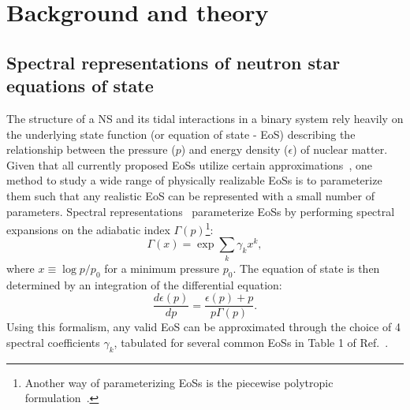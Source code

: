 \documentclass[prd,twocolumn,nofootinbib,superscriptaddress,amsmath,amssymb]{revtex4-1}
\begin{document}
\section{Background and theory}\label{sec:theory}

\subsection{Spectral representations of neutron star equations of state}
\label{sec:eos}

The structure of a NS and its tidal interactions in a binary system rely heavily on the underlying state function (or equation of state - EoS) describing the relationship between the pressure ($p$) and energy density ($\epsilon$) of nuclear matter.
Given that all currently proposed EoSs utilize certain approximations~\cite{Oertel:Review,Baym:Review}, one method to study a wide range of physically realizable EoSs is to parameterize them such that any realistic EoS can be represented with a small number of parameters.
Spectral representations~\cite{Lindblom:2010bb,Lindblom:2012zi,Lindblom:2013kra,Lindblom:2018rfr,Abbott:2018exr} parameterize EoSs by performing spectral expansions on the adiabatic index $\Gamma(p)$\footnote{Another way of parameterizing EoSs is the piecewise polytropic formulation~\cite{Read2009,Lackey:2014fwa,Carney:2018sdv}.}:
\begin{equation}
\Gamma(x) = \exp{\sum_k\gamma_k x^k},
\end{equation}
where $x \equiv \log{p/p_0}$ for a minimum pressure $p_0$.
The equation of state is then determined by an integration of the differential equation:
\begin{equation}
\frac{d \epsilon(p)}{dp}=\frac{\epsilon(p)+p}{p \Gamma(p)}.
\end{equation}
Using this formalism, any valid EoS can be approximated through the choice of 4 spectral coefficients $\gamma_k$, tabulated for several common EoSs in Table 1 of Ref.~\cite{Lindblom:2018rfr}.
\end{document}
